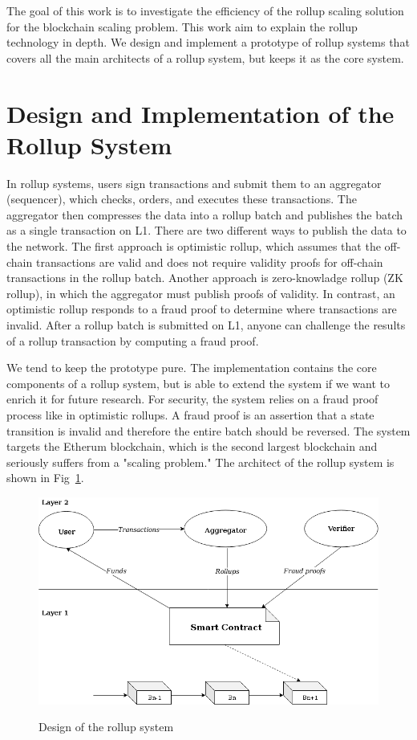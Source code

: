 \documentclass{article}
\begin{document}
The goal of this work is to investigate the efficiency of the rollup scaling solution for the blockchain scaling problem. This work aim to explain the rollup technology in depth.  We design and implement a prototype of  rollup systems that covers all the main architects of a rollup system, but keeps it as the core system.

\section{Design and Implementation of the Rollup System}
In rollup systems, users sign transactions and submit them to an aggregator (sequencer), which checks, orders, and executes these transactions. The aggregator then compresses the data into a rollup batch and publishes the batch as a single transaction on L1. There are two different ways to publish the data to the network. The first approach is optimistic rollup, which assumes that the off-chain transactions are valid and does not require validity proofs for off-chain transactions in the rollup batch. Another approach is zero-knowladge rollup (ZK rollup), in which the aggregator must publish proofs of validity. In contrast, an optimistic rollup responds to a fraud proof to determine where transactions are invalid. After a rollup batch is submitted on L1, anyone can challenge the results of a rollup transaction by computing a fraud proof.

We tend to keep the prototype pure. The implementation contains the core components of a rollup system, but is able to extend the system if we want to enrich it for future research. For security, the system relies on a fraud proof process like in optimistic rollups. A fraud proof is an assertion that a state transition is invalid and therefore the entire batch should be reversed. The system targets the Etherum blockchain, which is the second largest blockchain and seriously suffers from a "scaling problem." The architect of the rollup system is shown in Fig~\ref{rollup-design}.
\begin{figure}[t]
\caption{Design of the rollup system}
\includegraphics[width=12cm]{rollup-design.png}
\centering
\label{rollup-design}
\end{figure}
\end{document}
